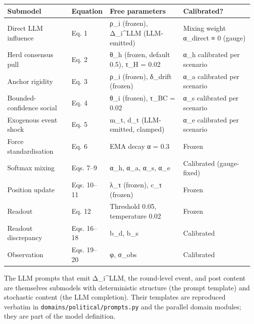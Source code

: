 \documentclass[
]{article}
\begin{document}
\begin{longtable}[]{@{}
  >{\raggedright\arraybackslash}p{}
  >{\raggedright\arraybackslash}p{}
  >{\raggedright\arraybackslash}p{}
  >{\raggedright\arraybackslash}p{}@{}}
\toprule\noalign{}
\begin{minipage}[b]{\linewidth}\raggedright
Submodel
\end{minipage} & \begin{minipage}[b]{\linewidth}\raggedright
Equation
\end{minipage} & \begin{minipage}[b]{\linewidth}\raggedright
Free parameters
\end{minipage} & \begin{minipage}[b]{\linewidth}\raggedright
Calibrated?
\end{minipage} \\
\midrule\noalign{}
\endhead
\bottomrule\noalign{}
\endlastfoot
Direct LLM influence & Eq. 1 & ρ\_i (frozen), Δ\_i\^{}LLM (LLM-emitted)
& Mixing weight α\_direct ≡ 0 (gauge) \\
Herd consensus pull & Eq. 2 & θ\_h (frozen, default 0.5), τ\_H = 0.02 &
α\_h calibrated per scenario \\
Anchor rigidity & Eq. 3 & ρ\_i (frozen), δ\_drift (frozen) & α\_a
calibrated per scenario \\
Bounded-confidence social & Eq. 4 & θ\_i (frozen), τ\_BC = 0.02 & α\_s
calibrated per scenario \\
Exogenous event shock & Eq. 5 & m\_t, d\_t (LLM-emitted, clamped) & α\_e
calibrated per scenario \\
Force standardisation & Eq. 6 & EMA decay α = 0.3 & Frozen \\
Softmax mixing & Eqs. 7--9 & α\_h, α\_a, α\_s, α\_e & Calibrated
(gauge-fixed) \\
Position update & Eqs. 10--11 & λ\_τ (frozen), c\_τ (frozen) & Frozen \\
Readout & Eq. 12 & Threshold 0.05, temperature 0.02 & Frozen \\
Readout discrepancy & Eqs. 16--18 & b\_d, b\_s & Calibrated \\
Observation & Eqs. 19--20 & φ, σ\_obs & Calibrated \\
\end{longtable}

The LLM prompts that emit Δ\_i\^{}LLM, the round-level event, and post
content are themselves submodels with deterministic structure (the
prompt template) and stochastic content (the LLM completion). Their
templates are reproduced verbatim in
\texttt{domains/political/prompts.py} and the parallel domain modules;
they are part of the model definition.
\end{document}
